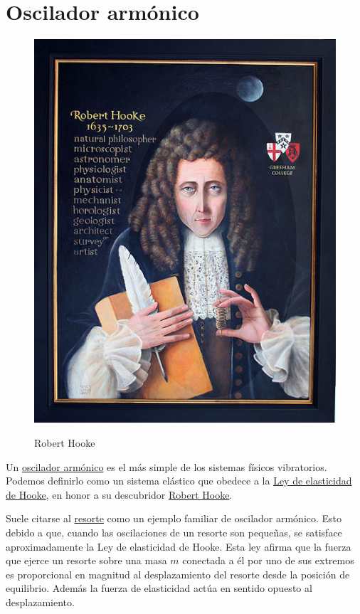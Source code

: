 \section{Oscilador armónico}\label{resortito}



\begin{figure}
\begin{center}
\includegraphics[scale=.15]{imagenes/Hooke.JPG}\\
\caption{Robert Hooke}
\end{center}
\end{figure}
Un \href{http://es.wikipedia.org/wiki/Oscilador_armónico}{oscilador armónico} es el más simple de los sistemas físicos vibratorios. Podemos definirlo como un sistema
elástico que obedece a la \href{http://es.wikipedia.org/wiki/Ley_de_Hooke}{Ley de elasticidad de Hooke}, en honor a su descubridor
\href{http://es.wikipedia.org/wiki/Robert_Hooke}{Robert Hooke}.

Suele citarse al \href{http://es.wikipedia.org/wiki/Resorte}{resorte} como un ejemplo familiar de oscilador armónico. Esto debido a que, cuando las oscilaciones de un resorte son
pequeñas,  se satisface aproximadamente la Ley de elasticidad de  Hooke. Esta ley  afirma que la fuerza que ejerce un resorte sobre una masa $m$ conectada a él por uno
de sus extremos es proporcional en magnitud al desplazamiento
del resorte desde la posición de equilibrio. Además la fuerza de elasticidad actúa en sentido opuesto al desplazamiento.

